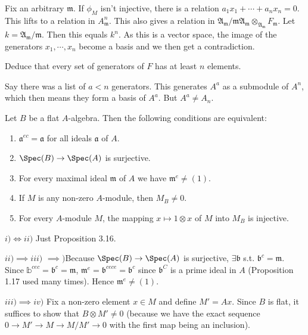 \begin{questions}
\begin{solution}
	Fix an arbitrary $\mathfrak{m} $.
	If $\phi _M $ isn't injective, there is a relation $a_1x_1 + \cdots + a_nx_n =0 $.
	This lifts to a relation in $A^n_{\mathfrak{m}} $.
	This also gives a relation in $\mathfrak{A}_{\mathfrak{m}} / \mathfrak{m}\mathfrak{A}_{\mathfrak{m}} \otimes_{\mathfrak{A}_{\mathfrak{m}}} F_{\mathfrak{m}}$.
	Let $k = \mathfrak{A}_{\mathfrak{m}} / \mathfrak{m}$.
	Then this equals $k^n $.
	As this is a vector space, the image of the generators $x_1,\cdots,x_n $ become a basis and we then get a contradiction.
\end{solution}
Deduce that every set of generators of $F$ has at least $n$ elements. 
\begin{solution}
	Say there was a list of $a<n $ generators.
	This generates $A^a $ as a submodule of $A^n $, which then means they form a basis of $A^a$.
	But $A^a \ne A_n $.
\end{solution}

\question Let $B $ be a flat $A $-algebra. Then the following conditions are equivalent:
\begin{enumerate}
	\item $\mathfrak{a}^{ec} = \mathfrak{a}  $ for all ideals $\mathfrak{a} $ of $A $.
	\item $\Spec(B) \to \Spec(A) $ is surjective.
	\item For every maximal ideal $\mathfrak{m} $ of $A $ we have $\mathfrak{m}^e \ne (1) $.
	\item If $M $ is any non-zero $A $-module, then $M_{B} \ne 0 $.
	\item For every $A $-module $M $, the mapping $x\mapsto 1 \otimes x $ of $M $ into $M_{B} $ is injective.
\end{enumerate}
\begin{solution}
	$i) \iff ii) $ Just Proposition 3.16.

	$ii) \implies iii) $ $\implies) $Because $\Spec(B)\to \Spec(A) $ is surjective, $\exists \mathfrak{b} $ s.t. $\mathfrak{b}^c = \mathfrak{m} $.
	Since $\mathbb{b}^{cec} = \mathfrak{b}^c = \mathfrak{m}  $, $\mathfrak{m}^e = \mathfrak{b}^{cece} = \mathfrak{b}^c  $ since $\mathfrak{b}^C $ is a prime ideal in $A $ (Proposition 1.17 used many times).
	Hence $\mathfrak{m}^e \ne (1) $.

	$iii) \implies iv) $
	Fix a non-zero element $x \in M $ and define $M' = Ax $.
	Since $B $ is flat, it suffices to show that $B \otimes M' \ne 0 $ (because we have the exact sequence $0 \to M' \to M \to M / M' \to 0 $ with the first map being an inclusion).


\end{solution}
\end{questions}
